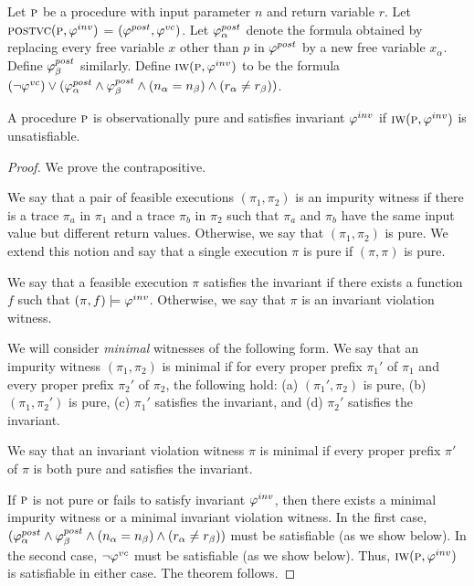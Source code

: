 Let $\textsc{p}$ be a procedure with input parameter $n$ and return variable $r$.
Let $\textsc{postvc}({\textsc{p}},{\varphi^{inv}})$ = $(\varphi^{post},\varphi^{vc})$.
Let $\varphi^{post}_\alpha$ denote the formula obtained by replacing every free variable $x$ other than $p$ in $\varphi^{post}$
by a new free variable $x_\alpha$. Define $\varphi^{post}_\beta$ similarly.
Define $\textsc{iw}(\textsc{p}, \varphi^{inv})$ to be the formula $(\neg \varphi^{vc}) \vee (\varphi^{post}_\alpha \wedge \varphi^{post}_\beta \wedge (n_\alpha = n_\beta) \wedge (r_\alpha \neq r_\beta))$.

\begin{theorem}
A procedure $\textsc{p}$ is observationally pure and satisfies invariant $\varphi^{inv}$
if $\textsc{iw}(\textsc{p}, \varphi^{inv})$ is unsatisfiable.
\end{theorem}

\begin{proof}
We prove the contrapositive.

We say that a pair of feasible executions $(\pi_1, \pi_2)$ is an impurity witness if there is a trace
$\pi_a$ in $\pi_1$ and a trace $\pi_b$ in $\pi_2$ such that $\pi_a$ and $\pi_b$ have the same input
value but different return values. Otherwise, we say that $(\pi_1, \pi_2)$ is pure. We extend
this notion and say that a single execution $\pi$ is pure if $(\pi,\pi)$ is pure.

We say that a feasible execution $\pi$ satisfies the invariant if there exists a function $f$ such that
$(\pi,f) \models \varphi^{inv}$. Otherwise, we say that $\pi$ is an invariant violation witness.

We will consider \emph{minimal} witnesses of the following form.
We say that an impurity witness $(\pi_1, \pi_2)$ is minimal if for every proper prefix $\pi_1'$ of
$\pi_1$ and every proper prefix $\pi_2'$ of $\pi_2$, the following hold:
(a) $(\pi_1',\pi_2)$ is pure,
(b) $(\pi_1,\pi_2')$ is pure,
(c) $\pi_1'$ satisfies the invariant, and
(d) $\pi_2'$ satisfies the invariant.

We say that an invariant violation witness $\pi$ is minimal if every proper prefix $\pi'$ of
$\pi$ is both pure and satisfies the invariant.

If $\textsc{p}$ is not pure or fails to satisfy invariant $\varphi^{inv}$, then there exists a minimal impurity witness
or a minimal invariant violation witness. In the first case, $(\varphi^{post}_\alpha \wedge \varphi^{post}_\beta \wedge (n_\alpha = n_\beta) \wedge (r_\alpha \neq r_\beta))$
must be satisfiable (as we show below). In the second case, $\neg \varphi^{vc}$ must be satisfiable (as we show below).
Thus,  $\textsc{iw}(\textsc{p}, \varphi^{inv})$  is satisfiable in either case. The theorem follows.


\end{proof}
